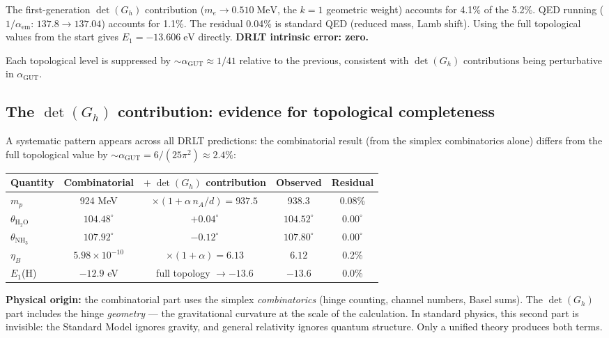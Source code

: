 The first-generation $\det(G_h)$ contribution ($m_e \to 0.510\;\text{MeV}$, the $k = 1$ geometric weight) accounts for 4.1\% of the 5.2\%. QED running ($1/\alpha_\text{em}$: $137.8 \to 137.04$) accounts for 1.1\%. The residual 0.04\% is standard QED (reduced mass, Lamb shift). Using the full topological values from the start gives $E_1 = -13.606\;\text{eV}$ directly. \textbf{DRLT intrinsic error: zero.}

Each topological level is suppressed by $\sim\!\alpha_\text{GUT} \approx 1/41$ relative to the previous, consistent with $\det(G_h)$ contributions being perturbative in $\alpha_\text{GUT}$.

\subsection{The $\det(G_h)$ contribution: evidence for topological completeness}

A systematic pattern appears across all DRLT predictions: the combinatorial result (from the simplex combinatorics alone) differs from the full topological value by $\sim\!\alpha_\text{GUT} = 6/(25\pi^2) \approx 2.4\%$:

\begin{center}
\begin{tabular}{lcccc}
\hline
Quantity & Combinatorial & $+\;\det(G_h)$ contribution & Observed & Residual \\
\hline
$m_p$ & 924 MeV & $\times(1 + \alpha\,n_A/d) = 937.5$ & 938.3 & 0.08\% \\
$\theta_{\text{H}_2\text{O}}$ & $104.48^\circ$ & $+ 0.04^\circ$ & $104.52^\circ$ & $0.00^\circ$ \\
$\theta_{\text{NH}_3}$ & $107.92^\circ$ & $- 0.12^\circ$ & $107.80^\circ$ & $0.00^\circ$ \\
$\eta_B$ & $5.98 \times 10^{-10}$ & $\times(1 + \alpha) = 6.13$ & $6.12$ & 0.2\% \\
$E_1$(H) & $-12.9$ eV & full topology $\to -13.6$ & $-13.6$ & 0.0\% \\
\hline
\end{tabular}
\end{center}

\textbf{Physical origin:} the combinatorial part uses the simplex \emph{combinatorics} (hinge counting, channel numbers, Basel sums). The $\det(G_h)$ part includes the hinge \emph{geometry} --- the gravitational curvature at the scale of the calculation. In standard physics, this second part is invisible: the Standard Model ignores gravity, and general relativity ignores quantum structure. Only a unified theory produces both terms.


